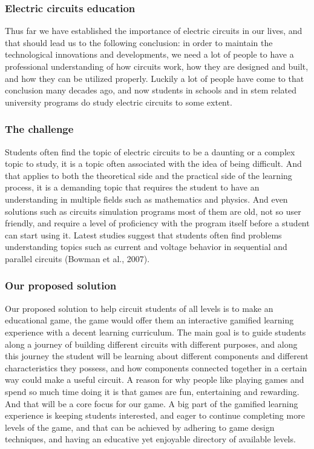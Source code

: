 \documentclass[../main.tex]{subfiles}
\begin{document}
\subsubsection{Electric circuits education}
Thus far we have established the importance of electric circuits in our lives, and that should lead us to the following conclusion: in order to maintain the technological innovations and developments, we need a lot of people to have a professional understanding of how circuits work, how they are designed and built, and how they can be utilized properly. Luckily a lot of people have come to that conclusion many decades ago, and now students in schools and in \acrfull{stem} related university programs do study electric circuits to some extent.

\subsubsection{The challenge}
Students often find the topic of electric circuits to be a daunting or a complex topic to study, it is a topic often associated with the idea of being difficult. And that applies to both the theoretical side and the practical side of the learning process, it is a demanding topic that requires the student to have an understanding in multiple fields such as mathematics and physics. And even solutions such as circuits simulation programs most of them are old, not so user friendly, and require a level of proficiency with the program itself before a student can start using it. Latest studies suggest that students often find problems understanding topics such as current and voltage behavior in sequential and parallel circuits (Bowman et al., 2007)\cite{1}.

\subsubsection{Our proposed solution}
Our proposed solution to help circuit students of all levels is to make an educational game, the game would offer them an interactive gamified learning experience with a decent learning curriculum. The main goal is to guide students along a journey of building different circuits with different purposes, and along this journey the student will be learning about different components and different characteristics they possess, and how components connected together in a certain way could make a useful circuit.
A reason for why people like playing games and spend so much time doing it is that games are fun, entertaining and rewarding. And that will be a core focus for our game. A big part of the gamified learning experience is keeping students interested, and eager to continue completing more levels of the game, and that can be achieved by adhering to game design techniques, and having an educative yet enjoyable directory of available levels.
\end{document}
